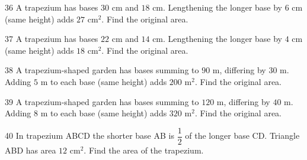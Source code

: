 \gap
\begin{probbox}{36}{}
A trapezium has bases $30$ cm and $18$ cm. Lengthening the longer base by $6$ cm (same height) adds $27$ cm$^2$. Find the original area.
\end{probbox}
\gap
\begin{probbox}{37}{}
A trapezium has bases $22$ cm and $14$ cm. Lengthening the longer base by $4$ cm (same height) adds $18$ cm$^2$. Find the original area.
\end{probbox}
\gap
\begin{probbox}{38}{}
A trapezium-shaped garden has bases summing to $90$ m, differing by $30$ m. Adding $5$ m to each base (same height) adds $200$ m$^2$. Find the original area.
\end{probbox}
\gap
\begin{probbox}{39}{}
A trapezium-shaped garden has bases summing to $120$ m, differing by $40$ m. Adding $8$ m to each base (same height) adds $320$ m$^2$. Find the original area.
\end{probbox}
\gap
\begin{probbox}{40}{}
In trapezium ABCD the shorter base AB is $\dfrac{1}{2}$ of the longer base CD. Triangle ABD has area $12$ cm$^2$. Find the area of the trapezium.
\end{probbox}
